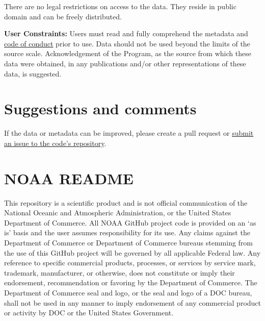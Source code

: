 \documentclass[
  letterpaper,
  oneside,
  open=any]{scrbook}
\begin{document}

There are no legal restrictions on access to the data. They reside in
public domain and can be freely distributed.

\textbf{User Constraints:} Users must read and fully comprehend the
metadata and
\href{https://IEA-Data.io/IEA_Data_Guidance_Doc/content/code-of-conduct.html}{code
of conduct} prior to use. Data should not be used beyond the limits of
the source scale. Acknowledgement of the Program, as the source from
which these data were obtained, in any publications and/or other
representations of these data, is suggested.

\section*{Suggestions and comments}\label{suggestions-and-comments}


If the data or metadata can be improved, please create a pull request or
\href{https://github.com/IEA-Data/IEA_Data_Guidance_Doc//issues}{submit
an issue to the code's repository}.

\section*{NOAA README}\label{noaa-readme}


This repository is a scientific product and is not official
communication of the National Oceanic and Atmospheric Administration, or
the United States Department of Commerce. All NOAA GitHub project code
is provided on an `as is' basis and the user assumes responsibility for
its use. Any claims against the Department of Commerce or Department of
Commerce bureaus stemming from the use of this GitHub project will be
governed by all applicable Federal law. Any reference to specific
commercial products, processes, or services by service mark, trademark,
manufacturer, or otherwise, does not constitute or imply their
endorsement, recommendation or favoring by the Department of Commerce.
The Department of Commerce seal and logo, or the seal and logo of a DOC
bureau, shall not be used in any manner to imply endorsement of any
commercial product or activity by DOC or the United States Government.
\end{document}
